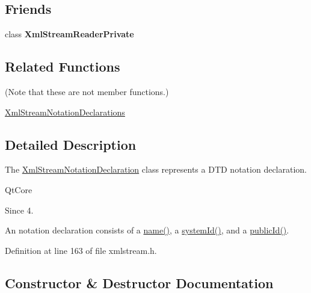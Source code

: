 \subsection*{Friends}
\begin{DoxyCompactItemize}
\item 
\mbox{\label{class_xml_stream_notation_declaration_a07cbe8adea255c3bb802811c3872de83}} 
class {\bfseries Xml\+Stream\+Reader\+Private}
\end{DoxyCompactItemize}
\subsection*{Related Functions}
(Note that these are not member functions.) \begin{DoxyCompactItemize}
\item 
\hyperlink{class_xml_stream_notation_declaration_ad9d46fd24dc57a73fc72e1e1c27cd185}{Xml\+Stream\+Notation\+Declarations}
\end{DoxyCompactItemize}


\subsection{Detailed Description}
The \hyperlink{class_xml_stream_notation_declaration}{Xml\+Stream\+Notation\+Declaration} class represents a D\+TD notation declaration. 

Qt\+Core \begin{DoxySince}{Since}
4. 
\end{DoxySince}
An notation declaration consists of a \hyperlink{class_xml_stream_notation_declaration_a4da496e98a28ca1a7900cb1b53e02ab7}{name()}, a \hyperlink{class_xml_stream_notation_declaration_a2d7315861053ed1130b180afaf2e67c6}{system\+Id()}, and a \hyperlink{class_xml_stream_notation_declaration_a4469e6a2ccc3556cbaf787448d441e0b}{public\+Id()}. 

Definition at line 163 of file xmlstream.\+h.



\subsection{Constructor \& Destructor Documentation}
\mbox{\label{class_xml_stream_notation_declaration_ab189bffc2f535e607045e724645cea66}} 
